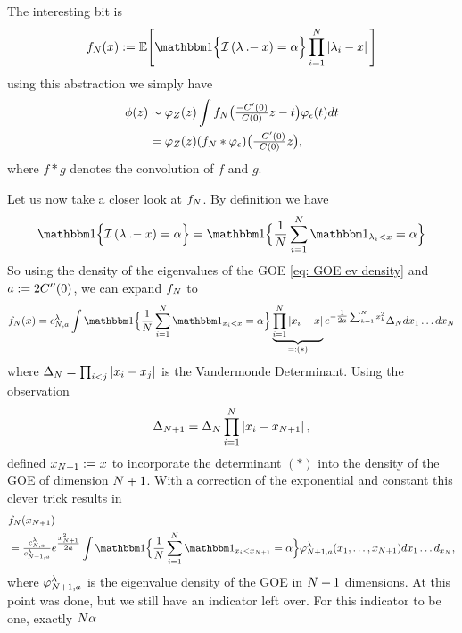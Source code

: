 The interesting bit is
\[
	f_\dimension(x):=\E\Bigg[
		\ind\Bigl\{
			\negEV\left(\lambda \dotMinus x\right) = \alpha
		\Bigr\}
		\prod_{i=1}^\dimension \left|
			\lambda_i - x
		\right|
	\Bigg]
\]
using this abstraction we simply have
\[\begin{aligned}
	\phi(z)
	&\sim \varphi_Z(z)
	\int f_N\bigl(\tfrac{-C'(0)}{C(0)}z - t\bigr)
	\varphi_\epsilon(t)dt\\
	&= \varphi_Z(z)
	(f_N * \varphi_\epsilon)\bigl(\tfrac{-C'(0)}{C(0)}z\bigr),
\end{aligned}\]
where \(f*g\) denotes the convolution of \(f\) and \(g\).

Let us now take a closer look at \(f_N\). 
By definition we have
\[
		\ind\Bigl\{
			\negEV\left(\lambda \dotMinus x\right) = \alpha
		\Bigr\}
		= \ind\Bigl\{
			\frac1\dimension\sum_{i=1}^\dimension \ind_{\lambda_i < x} = \alpha
		\Bigr\}
\]
So using the density of the
eigenvalues of the GOE \eqref{eq: GOE ev density} and \(a:=2C''(0)\),
we can expand \(f_N\) to
\[
	f_\dimension(x)
	= c^\lambda_{\dimension,a}\int
	\ind\Bigl\{
			\frac1\dimension\sum_{i=1}^\dimension \ind_{x_i < x} = \alpha
	\Bigr\}
	\underbrace{
	\prod_{i=1}^\dimension \left|
		x_i - x
	\right|
	}_{=:(*)}
	e^{-\tfrac1{2a}\sum_{k=1}^\dimension x_k^2} \Delta_N dx_1\dots dx_\dimension
\]
where \(\Delta_N = \prod_{i<j}|x_i-x_j|\) is the Vandermonde
Determinant. Using the observation
\[
	\Delta_{N+1} = 
	\Delta_N\prod_{i=1}^N \left|
		x_i - x_{N+1}
	\right|,
\]
\textcite{fyodorovComplexityRandomEnergy2004} defined \(x_{N+1}:=x\) to
incorporate the determinant \((*)\) into the density of the GOE of dimension
\(N+1\). With a correction of the exponential and constant this
clever trick results in
\[\begin{aligned}
	&f_\dimension(x_{\dimension+1})\\
	&= \tfrac{c^\lambda_{\dimension, a}}{c^\lambda_{\dimension+1,a}}
	e^{\tfrac{x_{\dimension+1}^2}{2a}}
	\int \ind\Bigl\{
			\frac1\dimension\sum_{i=1}^\dimension \ind_{x_i < x_{\dimension+1}} = \alpha
	\Bigr\}
	\varphi^\lambda_{\dimension+1,a}(x_1,\dots,x_{\dimension+1})
	dx_1\dots d_{x_\dimension},
\end{aligned}\]
where \(\varphi^\lambda_{N+1,a}\) is the eigenvalue density of the GOE
in \(N+1\) dimensions. At this point
\textcite{fyodorovComplexityRandomEnergy2004} was done, but we still have an
indicator left over. For this indicator to be one, exactly \(N\alpha\)
